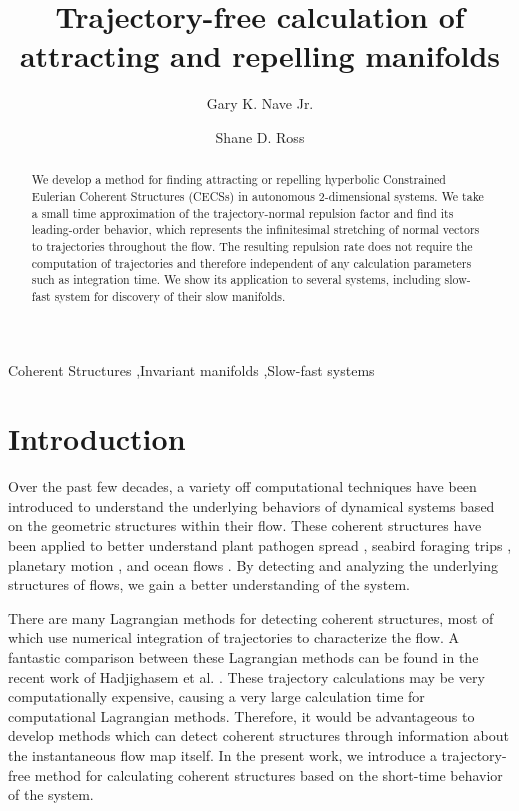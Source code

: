 \documentclass[onecolumn,3p]{elsarticle}
\begin{document}
	\begin{frontmatter}
		\title{Trajectory-free calculation of attracting and repelling manifolds}
		\author{Gary K. Nave Jr.}
		
		\author{Shane D. Ross}
		
		\address{Engineering Mechanics Program, Virginia Tech}
		
		\begin{abstract}
			We develop a method for finding attracting or repelling hyperbolic Constrained Eulerian Coherent Structures (CECSs) in autonomous 2-dimensional systems. We take a small time approximation of the trajectory-normal repulsion factor and find its leading-order behavior, which represents the infinitesimal stretching of normal vectors to trajectories throughout the flow. The resulting repulsion rate does not require the computation of trajectories and therefore independent of any calculation parameters such as integration time. We show its application to several systems, including slow-fast system for discovery of their slow manifolds.
		\end{abstract}
	\begin{keyword}
		Coherent Structures \sep Invariant manifolds \sep Slow-fast systems
	\end{keyword}
	\end{frontmatter}

	\section{Introduction}
	Over the past few decades, a variety off computational techniques have been introduced to understand the underlying behaviors of dynamical systems based on the geometric structures within their flow. These coherent structures have been applied to better understand plant pathogen spread \cite{schmale2015highways}, seabird foraging trips \cite{kai2009top}, planetary motion \cite{gawlik2009lagrangian}, and ocean flows \cite{wiggins2005dynamical}. By detecting and analyzing the underlying structures of flows, we gain a better understanding of the system.
	
	There are many Lagrangian methods for detecting coherent structures, most of which use numerical integration of trajectories to characterize the flow. A fantastic comparison between these Lagrangian methods can be found in the recent work of Hadjighasem et al. \cite{hadjighasem2017critical}. These trajectory calculations may be very computationally expensive, causing a very large calculation time for computational Lagrangian methods. Therefore, it would be advantageous to develop methods which can detect coherent structures through information about the instantaneous flow map itself. In the present work, we introduce a trajectory-free method for calculating coherent structures based on the short-time behavior of the system.
	
\end{document}
